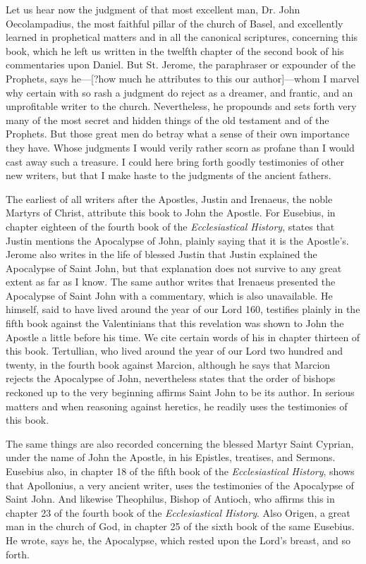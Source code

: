 Let us hear now the judgment of that most excellent man, Dr. John Oecolampadius, the most faithful pillar of the church of Basel, and excellently learned in prophetical matters and in all the canonical scriptures, concerning this book, which he left us written in the twelfth chapter of the second book of his commentaries upon Daniel. But St. Jerome, the paraphraser or expounder of the Prophets, says he—[?how much he attributes to this our author]—whom I marvel why certain with so rash a judgment do reject as a dreamer, and frantic, and an unprofitable writer to the church. Nevertheless, he propounds and sets forth very many of the most secret and hidden things of the old testament and of the Prophets. But those great men do betray what a sense of their own importance they have. Whose judgments I would verily rather scorn as profane than I would cast away such a treasure. I could here bring forth goodly testimonies of other new writers, but that I make haste to the judgments of the ancient fathers.

The earliest of all writers after the Apostles, Justin and Irenaeus, the noble Martyrs of Christ, attribute this book to John the Apostle. For Eusebius, in chapter eighteen of the fourth book of the \textit{Ecclesiastical History}, states that Justin mentions the Apocalypse of John, plainly saying that it is the Apostle’s. Jerome also writes in the life of blessed Justin that Justin explained the Apocalypse of Saint John, but that explanation does not survive to any great extent as far as I know. The same author writes that Irenaeus presented the Apocalypse of Saint John with a commentary, which is also unavailable. He himself, said to have lived around the year of our Lord 160, testifies plainly in the fifth book against the Valentinians that this revelation was shown to John the Apostle a little before his time. We cite certain words of his in chapter thirteen of this book. Tertullian, who lived around the year of our Lord two hundred and twenty, in the fourth book against Marcion, although he says that Marcion rejects the Apocalypse of John, nevertheless states that the order of bishops reckoned up to the very beginning affirms Saint John to be its author. In serious matters and when reasoning against heretics, he readily uses the testimonies of this book.

The same things are also recorded concerning the blessed Martyr Saint Cyprian, under the name of John the Apostle, in his Epistles, treatises, and Sermons. Eusebius also, in chapter 18 of the fifth book of the \textit{Ecclesiastical History}, shows that Apollonius, a very ancient writer, uses the testimonies of the Apocalypse of Saint John. And likewise Theophilus, Bishop of Antioch, who affirms this in chapter 23 of the fourth book of the \textit{Ecclesiastical History}. Also Origen, a great man in the church of God, in chapter 25 of the sixth book of the same Eusebius. He wrote, says he, the Apocalypse, which rested upon the Lord’s breast, and so forth.

